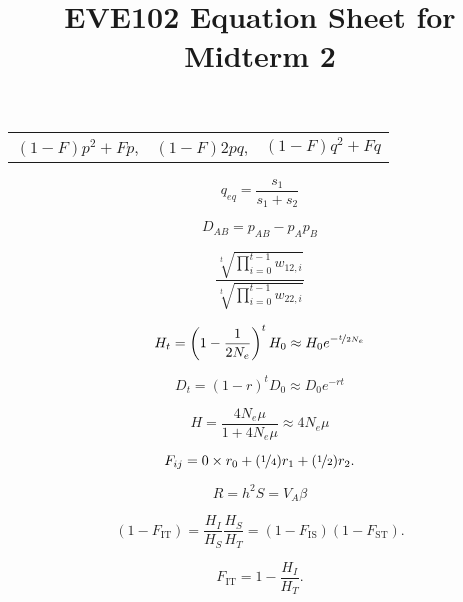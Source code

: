 \documentclass[12pt,twocolumn]{article}
\newcommand{\fis}{F_{\mathrm{IS}}}
\newcommand{\fit}{F_{\mathrm{IT}}}
\newcommand{\fst}{F_{\mathrm{ST}}}
\begin{document}
\title{EVE102 Equation Sheet for Midterm 2}
\date{}
\maketitle

\begin{center}
\begin{tabular}{ccc}
$(1-F) p^2 + F p$, & $(1-F) 2pq$, & $(1-F) q^2 + F q$ \nonumber
\end{tabular}
\end{center}

\begin{equation}
q_{eq} = \frac{s_1}{s_1+s_2}
\end{equation}

\begin{equation}
D_{AB} = p_{AB} - p_Ap_B \nonumber
\end{equation}

\begin{equation}
	\frac{\sqrt[t]{\prod_{i=0}^{t-1}w_{12,i}}}{\sqrt[t]{\prod_{i=0}^{t-1}w_{22,i}}} \nonumber
\end{equation}

\begin{equation}
  H_t = \left(1-\frac{1}{2N_e} \right)^tH_0 \approx H_0 e^{-\nicefrac{t}{2N_e}} \nonumber
\end{equation}

\begin{equation}
  D_t=  (1-r)^t D_0 \approx D_0 e^{-rt} \nonumber
\end{equation}

\begin{equation}
  H = \frac{4N_e\mu}{1+4N_e\mu} \approx 4N_e\mu  \nonumber
\end{equation}

\begin{equation}
  F_{ij}= 0 \times r_0 + (\nicefrac{1}{4}) r_1  + (\nicefrac{1}{2}) r_2.  \nonumber
\label{eqn:coeffkinship}
\end{equation}

\begin{equation}
R = h^2 S = V_A \beta
\end{equation}


\begin{equation}
(1-\fit) =\frac{H_I}{H_S} \frac{H_S}{H_T}=(1-\fis)(1-\fst).\nonumber
\label{eqn:F_relationships}
\end{equation}

\begin{equation}
\fit =1-\frac{H_I}{H_T}.\nonumber
\end{equation}
\end{document}

